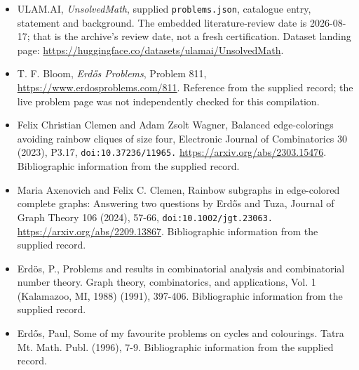 \documentclass[11pt,a4paper]{article}
\begin{document}
{\small

\begin{itemize}

\item[\hypertarget{source:statement:1}{S1}] ULAM.AI, \emph{UnsolvedMath}, supplied \texttt{problems.json}, catalogue entry, statement and background. The embedded literature-review date is 2026-08-17; that is the archive’s review date, not a fresh certification. Dataset landing page: \url{https://huggingface.co/datasets/ulamai/UnsolvedMath}.

\item[\hypertarget{source:statement:2}{S2}] T. F. Bloom, \emph{Erdős Problems}, Problem 811, \url{https://www.erdosproblems.com/811}. Reference from the supplied record; the live problem page was not independently checked for this compilation.

\item[\hypertarget{source:statement:3}{S3}] Felix Christian Clemen and Adam Zsolt Wagner, Balanced edge-colorings avoiding rainbow cliques of size four, Electronic Journal of Combinatorics 30 (2023), P3.17, \nolinkurl{doi:10.37236/11965.} \url{https://arxiv.org/abs/2303.15476}. Bibliographic information from the supplied record.

\item[\hypertarget{source:statement:4}{S4}] Maria Axenovich and Felix C. Clemen, Rainbow subgraphs in edge-colored complete graphs: Answering two questions by Erdős and Tuza, Journal of Graph Theory 106 (2024), 57-66, \nolinkurl{doi:10.1002/jgt.23063.} \url{https://arxiv.org/abs/2209.13867}. Bibliographic information from the supplied record.

\item[\hypertarget{source:statement:5}{S5}] Erd\"{o}s, P., Problems and results in combinatorial analysis and combinatorial number theory. Graph theory, combinatorics, and applications, Vol. 1 (Kalamazoo, MI, 1988) (1991), 397-406. Bibliographic information from the supplied record.

\item[\hypertarget{source:statement:6}{S6}] Erd\H{o}s, Paul, Some of my favourite problems on cycles and colourings. Tatra Mt. Math. Publ. (1996), 7-9. Bibliographic information from the supplied record.

\end{itemize}

}

\label{end:statement}
\end{document}
